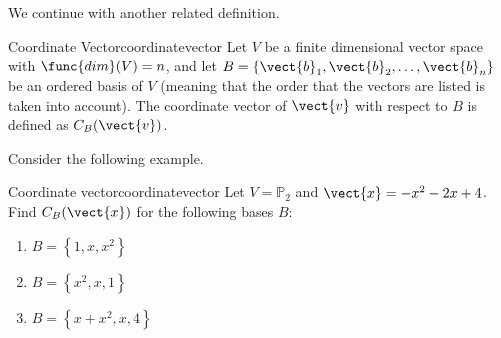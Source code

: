 We continue with another related definition.

\begin{definition}{Coordinate Vector}{coordinatevector}
Let $V$ be a finite dimensional vector space with $\func{dim}(V)=n$, and
let $B=\{\vect{b}_1, \vect{b}_2, \ldots, \vect{b}_n\}$ be an ordered basis of $V$ (meaning that the order that the
vectors are listed is taken into account).
The coordinate vector of $\vect{v}$ with respect to $B$ is defined
as $C_B(\vect{v})$.
\end{definition}

Consider the following example.

\begin{example}{Coordinate vector}{coordinatevector}
Let $V = \mathbb{P}_2$ and $\vect{x} = -x^2 -2x + 4$. 
Find $C_B(\vect{x})$ for the following bases $B$:
\begin{enumerate}
\item $B = \left\{ 1, x, x^2 \right\}$
\item $B = \left\{ x^2, x, 1 \right\}$
\item $B = \left\{ x + x^2 , x , 4 \right\}$
\end{enumerate}
\end{example}

